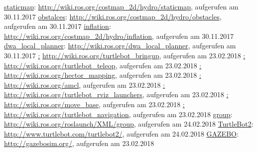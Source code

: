 \begin{thebibliography}{999}
 \href{http://wiki.ros.org/costmap_2d/hydro/staticmap}{staticmap}: \url{http://wiki.ros.org/costmap_2d/hydro/staticmap}, aufgerufen am 30.11.2017
 \href{http://wiki.ros.org/costmap_2d/hydro/obstacles}{obstalces}: \url{http://wiki.ros.org/costmap_2d/hydro/obstacles}, aufgerufen am 30.11.2017
 \href{http://wiki.ros.org/costmap_2d/hydro/inflation}{inflation}: \url{http://wiki.ros.org/costmap_2d/hydro/inflation}, aufgerufen am 30.11.2017
 \href{http://wiki.ros.org/dwa_local_planner}{dwa\_local\_planner}: \url{http://wiki.ros.org/dwa_local_planner}, aufgerufen am 30.11.2017
 \href{http://wiki.ros.org/turtlebot_bringup}: \url{http://wiki.ros.org/turtlebot_bringup}, aufgerufen am 23.02.2018
 \href{http://wiki.ros.org/turtlebot_teleop}: \url{http://wiki.ros.org/turtlebot_teleop}, aufgerufen am 23.02.2018
 \href{http://wiki.ros.org/hector_mapping}: \url{http://wiki.ros.org/hector_mapping}, aufgerufen am 23.02.2018
 \href{http://wiki.ros.org/amcl}: \url{http://wiki.ros.org/amcl}, aufgerufen am 23.02.2018
 \href{http://wiki.ros.org/turtlebot_rviz_launchers}: \url{http://wiki.ros.org/turtlebot_rviz_launchers}, aufgerufen am 23.02.2018
 \href{http://wiki.ros.org/move_base}: \url{http://wiki.ros.org/move_base}, aufgerufen am 23.02.2018
 \href{http://wiki.ros.org/turtlebot_navigation}: \url{http://wiki.ros.org/turtlebot_navigation}, aufgerufen am 23.02.2018
 \href{http://wiki.ros.org/roslaunch/XML/group}{group}: \url{http://wiki.ros.org/roslaunch/XML/group}, aufgerufen am 24.02.2018
 \href{http://www.turtlebot.com/turtlebot2/}{TurtleBot2}: \url{http://www.turtlebot.com/turtlebot2/}, aufgerufen am 24.02.2018
 \href{http://gazebosim.org/}{GAZEBO}: \url{http://gazebosim.org/}, aufgerufen am 23.02.2018





\end{thebibliography}